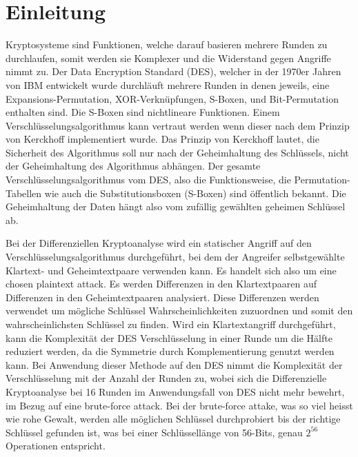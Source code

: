 \clearpage
\section{Einleitung}\label{sec:Einleitung}

Kryptosysteme sind Funktionen, welche darauf basieren mehrere Runden zu durchlaufen, somit werden sie Komplexer und die Widerstand gegen Angriffe nimmt zu. Der Data Encryption Standard (DES), welcher in der 1970er Jahren von IBM entwickelt wurde durchläuft mehrere Runden in denen jeweils, eine Expansions-Permutation,  XOR-Verknüpfungen, S-Boxen, und Bit-Permutation enthalten sind. Die S-Boxen sind nichtlineare Funktionen. Einem Verschlüsselungsalgorithmus kann vertraut werden wenn dieser nach dem Prinzip von Kerckhoff implementiert wurde. Das Prinzip von Kerckhoff lautet, die Sicherheit des Algorithmus soll nur nach der Geheimhaltung des Schlüssels, nicht der Geheimhaltung des Algorithmus abhängen. 
Der gesamte Verschlüsselungsalgorithmus vom DES, also die Funktionsweise, die Permutation-Tabellen wie auch die Substitutionsboxen (S-Boxen) sind öffentlich bekannt. 
Die Geheimhaltung der Daten hängt also vom zufällig gewählten geheimen Schlüssel ab. 

Bei der Differenziellen Kryptoanalyse wird ein statischer Angriff auf den Verschlüsselungsalgorithmus durchgeführt, bei dem der Angreifer selbstgewählte Klartext- und Geheimtextpaare verwenden kann. Es handelt sich also um eine chosen plaintext attack.  
Es werden Differenzen in den Klartextpaaren auf Differenzen in den Geheimtextpaaren analysiert. Diese Differenzen werden verwendet um mögliche Schlüssel Wahrscheinlichkeiten zuzuordnen und somit den wahrscheinlichsten Schlüssel zu finden. 
Wird ein Klartextangriff durchgeführt, kann die Komplexität der DES Verschlüsselung in einer Runde um die Hälfte reduziert werden, da die Symmetrie durch Komplementierung genutzt werden kann. Bei Anwendung dieser Methode auf den DES nimmt die Komplexität der Verschlüsselung mit der Anzahl der Runden zu, wobei sich die Differenzielle Kryptoanalyse bei 16 Runden im Anwendungsfall von DES nicht mehr bewehrt, im Bezug auf eine brute-force attack. Bei der brute-force attake, was so viel heisst wie rohe Gewalt, werden alle möglichen Schlüssel durchprobiert bis der richtige Schlüssel gefunden ist, was bei einer Schlüssellänge von 56-Bits, genau $2^{56}$ Operationen entspricht. 
 
 \newpage




